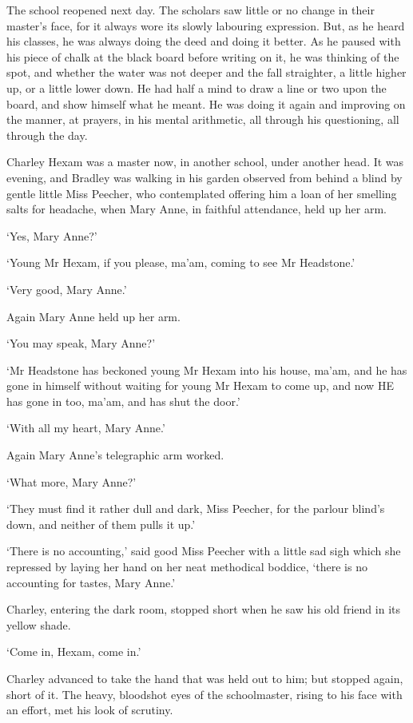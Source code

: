 The school reopened next day. The scholars saw little or no change in
their master’s face, for it always wore its slowly labouring expression.
But, as he heard his classes, he was always doing the deed and doing it
better. As he paused with his piece of chalk at the black board before
writing on it, he was thinking of the spot, and whether the water was
not deeper and the fall straighter, a little higher up, or a little
lower down. He had half a mind to draw a line or two upon the board, and
show himself what he meant. He was doing it again and improving on
the manner, at prayers, in his mental arithmetic, all through his
questioning, all through the day.

Charley Hexam was a master now, in another school, under another head.
It was evening, and Bradley was walking in his garden observed from
behind a blind by gentle little Miss Peecher, who contemplated offering
him a loan of her smelling salts for headache, when Mary Anne, in
faithful attendance, held up her arm.

‘Yes, Mary Anne?’

‘Young Mr Hexam, if you please, ma’am, coming to see Mr Headstone.’

‘Very good, Mary Anne.’

Again Mary Anne held up her arm.

‘You may speak, Mary Anne?’

‘Mr Headstone has beckoned young Mr Hexam into his house, ma’am, and he
has gone in himself without waiting for young Mr Hexam to come up, and
now HE has gone in too, ma’am, and has shut the door.’

‘With all my heart, Mary Anne.’

Again Mary Anne’s telegraphic arm worked.

‘What more, Mary Anne?’

‘They must find it rather dull and dark, Miss Peecher, for the parlour
blind’s down, and neither of them pulls it up.’

‘There is no accounting,’ said good Miss Peecher with a little sad sigh
which she repressed by laying her hand on her neat methodical boddice,
‘there is no accounting for tastes, Mary Anne.’

Charley, entering the dark room, stopped short when he saw his old
friend in its yellow shade.

‘Come in, Hexam, come in.’

Charley advanced to take the hand that was held out to him; but stopped
again, short of it. The heavy, bloodshot eyes of the schoolmaster,
rising to his face with an effort, met his look of scrutiny.

